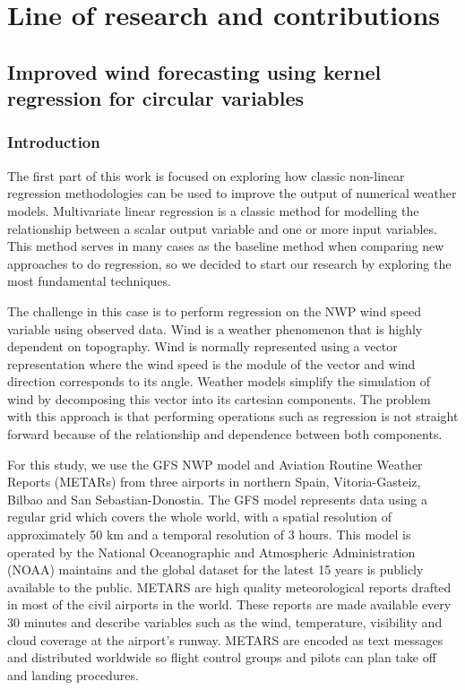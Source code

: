 
\chapter{Line of research and contributions} %

\label{Chapter2} %

\section{Improved wind forecasting using kernel regression for circular variables}

\subsection{Introduction}
The first part of this work is focused on exploring how classic non-linear regression methodologies can be used to improve the output of numerical weather models. Multivariate linear regression is a classic method for modelling the relationship between a scalar output variable and one or more input variables. This method serves in many cases as the baseline method when comparing new approaches to do regression, so we decided to start our research by exploring the most fundamental techniques.

The challenge in this case is to perform regression on the NWP wind speed variable using observed data. Wind is a weather phenomenon that is highly dependent on topography. Wind is normally represented using a vector representation where the wind speed is the module of the vector and wind direction corresponds to its angle. Weather models simplify the simulation of wind by decomposing this vector into its cartesian components. The problem with this approach is that performing operations such as regression is not straight forward because of the relationship and dependence between both components.

For this study, we use the GFS NWP model and Aviation Routine Weather Reports (METARs) from three airports in northern Spain, Vitoria-Gasteiz, Bilbao and San Sebastian-Donostia. The GFS model represents data using a regular grid which covers the whole world, with a spatial resolution of approximately 50 km and a temporal resolution of 3 hours. This model is operated by the National Oceanographic and Atmospheric Administration (NOAA) maintains and the global dataset for the latest 15 years is publicly available to the public. METARS are high quality meteorological reports drafted in most of the civil airports in the world. These reports are made available every 30 minutes and describe variables such as the wind, temperature, visibility and cloud coverage at the airport's runway. METARS are encoded as text messages and distributed worldwide so flight control groups and pilots can plan take off and landing procedures.

